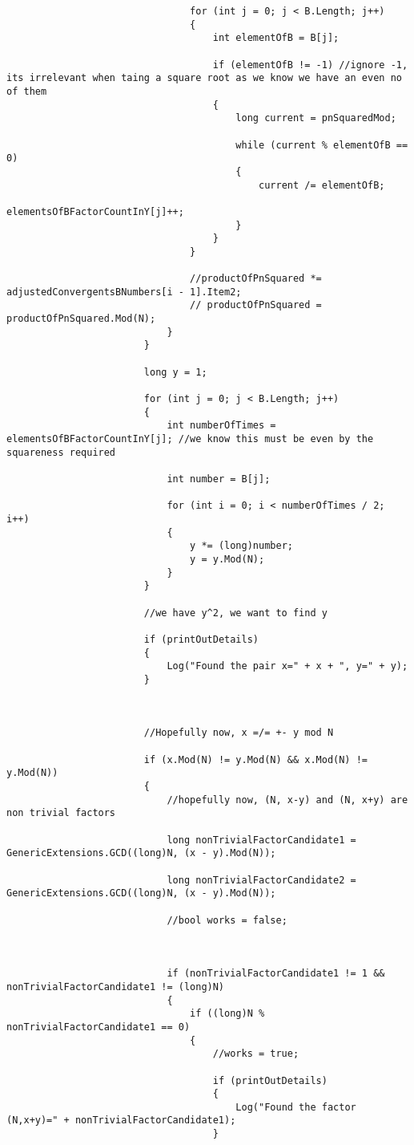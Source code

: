 \documentclass{article}
\begin{document}
\begin{lstlisting}
								for (int j = 0; j < B.Length; j++)
								{
									int elementOfB = B[j];
									
									if (elementOfB != -1) //ignore -1, its irrelevant when taing a square root as we know we have an even no of them
									{
										long current = pnSquaredMod;
										
										while (current % elementOfB == 0)
										{
											current /= elementOfB;
											elementsOfBFactorCountInY[j]++;
										}
									}
								}
								
								//productOfPnSquared *= adjustedConvergentsBNumbers[i - 1].Item2;
								// productOfPnSquared = productOfPnSquared.Mod(N);
							}
						}
						
						long y = 1;
						
						for (int j = 0; j < B.Length; j++)
						{
							int numberOfTimes = elementsOfBFactorCountInY[j]; //we know this must be even by the squareness required
							
							int number = B[j];
							
							for (int i = 0; i < numberOfTimes / 2; i++)
							{
								y *= (long)number;
								y = y.Mod(N);
							}
						}
						
						//we have y^2, we want to find y
						
						if (printOutDetails)
						{
							Log("Found the pair x=" + x + ", y=" + y);
						}
						
						
						
						//Hopefully now, x =/= +- y mod N
						
						if (x.Mod(N) != y.Mod(N) && x.Mod(N) != y.Mod(N))
						{
							//hopefully now, (N, x-y) and (N, x+y) are non trivial factors
							
							long nonTrivialFactorCandidate1 = GenericExtensions.GCD((long)N, (x - y).Mod(N));
							
							long nonTrivialFactorCandidate2 = GenericExtensions.GCD((long)N, (x - y).Mod(N));
							
							//bool works = false;
							
							
							
							if (nonTrivialFactorCandidate1 != 1 && nonTrivialFactorCandidate1 != (long)N)
							{
								if ((long)N % nonTrivialFactorCandidate1 == 0)
								{
									//works = true;
									
									if (printOutDetails)
									{
										Log("Found the factor (N,x+y)=" + nonTrivialFactorCandidate1);
									}
									

\end{lstlisting}
\end{document}
